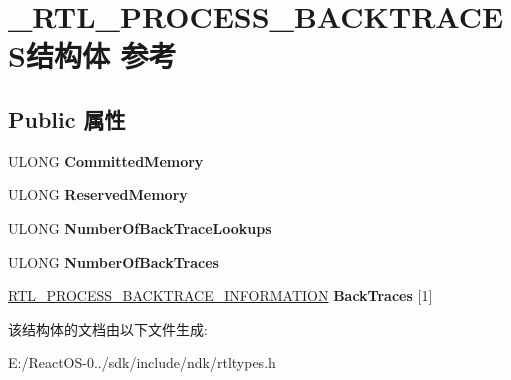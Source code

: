 \hypertarget{struct___r_t_l___p_r_o_c_e_s_s___b_a_c_k_t_r_a_c_e_s}{}\section{\+\_\+\+R\+T\+L\+\_\+\+P\+R\+O\+C\+E\+S\+S\+\_\+\+B\+A\+C\+K\+T\+R\+A\+C\+E\+S结构体 参考}
\label{struct___r_t_l___p_r_o_c_e_s_s___b_a_c_k_t_r_a_c_e_s}
\subsection*{Public 属性}
\begin{DoxyCompactItemize}
\item 
\mbox{\label{struct___r_t_l___p_r_o_c_e_s_s___b_a_c_k_t_r_a_c_e_s_a25f1e1b4ac95043c32a0e91dfcdc3075}} 
U\+L\+O\+NG {\bfseries Committed\+Memory}
\item 
\mbox{\label{struct___r_t_l___p_r_o_c_e_s_s___b_a_c_k_t_r_a_c_e_s_abba75bc1b70a72234b8c6f0b27dbad77}} 
U\+L\+O\+NG {\bfseries Reserved\+Memory}
\item 
\mbox{\label{struct___r_t_l___p_r_o_c_e_s_s___b_a_c_k_t_r_a_c_e_s_ad7d6e705db3744a021f088d54d77946c}} 
U\+L\+O\+NG {\bfseries Number\+Of\+Back\+Trace\+Lookups}
\item 
\mbox{\label{struct___r_t_l___p_r_o_c_e_s_s___b_a_c_k_t_r_a_c_e_s_a9d15841bf443df407665c70b5f9bb453}} 
U\+L\+O\+NG {\bfseries Number\+Of\+Back\+Traces}
\item 
\mbox{\label{struct___r_t_l___p_r_o_c_e_s_s___b_a_c_k_t_r_a_c_e_s_a62008eb9f22ef228e65bd5658e682d77}} 
\hyperlink{struct___r_t_l___p_r_o_c_e_s_s___b_a_c_k_t_r_a_c_e___i_n_f_o_r_m_a_t_i_o_n}{R\+T\+L\+\_\+\+P\+R\+O\+C\+E\+S\+S\+\_\+\+B\+A\+C\+K\+T\+R\+A\+C\+E\+\_\+\+I\+N\+F\+O\+R\+M\+A\+T\+I\+ON} {\bfseries Back\+Traces} \mbox{[}1\mbox{]}
\end{DoxyCompactItemize}


该结构体的文档由以下文件生成\+:\begin{DoxyCompactItemize}
\item 
E\+:/\+React\+O\+S-\/0../sdk/include/ndk/rtltypes.\+h\end{DoxyCompactItemize}

